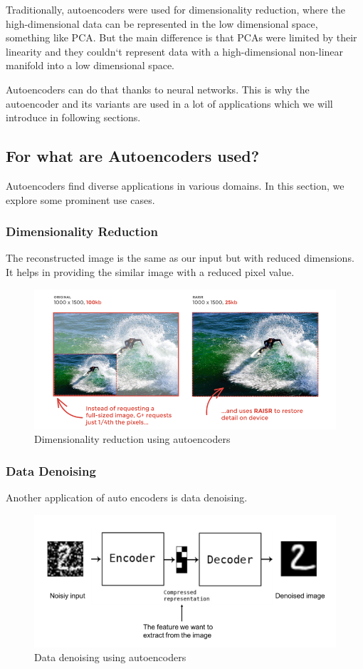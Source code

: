\documentclass{article}
\begin{document}
	Traditionally, autoencoders were used for dimensionality reduction, where the high-dimensional data can be represented in the low dimensional space, something like PCA. But the main difference is that PCAs were limited by their linearity and they couldn`t represent data with a high-dimensional non-linear manifold into a low dimensional space.
	
	Autoencoders can do that thanks to neural networks. This is why the autoencoder and its variants are used in a lot of applications which we will introduce in following sections.

		\subsection{For what are Autoencoders used?}
			Autoencoders find diverse applications in various domains. In this section, we explore some prominent use cases.

		\subsubsection{Dimensionality Reduction}

			The reconstructed image is the same as our input but with reduced dimensions. It helps in providing the similar image with a reduced pixel value.

			\begin{figure}[H]
				\centering
				\includegraphics[width=0.8\linewidth]{images/dimensionality-reduction.png}
				\caption{Dimensionality reduction using autoencoders}
				\label{fig:dimensionality-reduction}
			\end{figure}

		\subsubsection{Data Denoising}

			Another application of auto encoders is data denoising.

			\begin{figure}[H]
				\centering
				\includegraphics[width=0.8\linewidth]{images/denosing.png}
				\caption{Data denoising using autoencoders}
				\label{fig:denosing}
			\end{figure}
\end{document}

